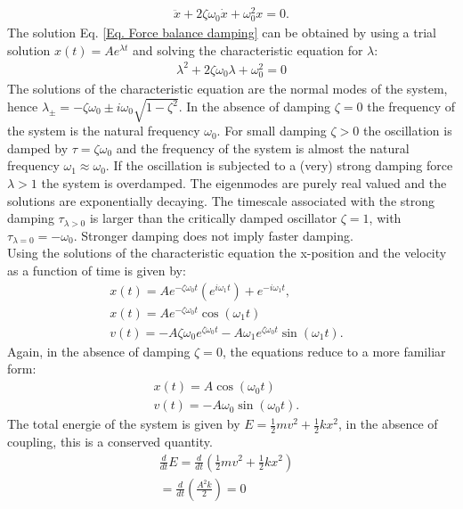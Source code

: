 \documentclass{article}
\begin{document}
\begin{align}
    \ddot{x} + 2\zeta\omega_0\dot{x} +\omega_0^2x = 0.
    \label{Eq. Force balance damping}
\end{align}
The solution Eq. \ref{Eq. Force balance damping} can be obtained by using a trial solution $x(t) = Ae^{\lambda t}$ and solving the characteristic equation for $\lambda$:
\begin{align}
    \lambda^2 + 2\zeta\omega_0\lambda + \omega_0^2 = 0
\end{align}
The solutions of the characteristic equation are the normal modes of the system, hence $\lambda_{\pm} = -\zeta\omega_0 \pm i\omega_0\sqrt{1-\zeta^2}$. In the absence of damping $\zeta = 0$ the frequency of the system is the natural frequency $\omega_0$. For small damping $\zeta>0$ the oscillation is damped by $\tau = \zeta \omega_0$ and the frequency of the system is almost the natural frequency $\omega_1 \approx \omega_0$. If the oscillation is subjected to a (very) strong damping force $\lambda > 1$ the system is overdamped. The eigenmodes are purely real valued and the solutions are exponentially decaying. The timescale associated with the strong damping $\tau_{\lambda>0}$ is larger than the critically damped oscillator $\zeta =1$, with $\tau_{\lambda=0} = -\omega_0$. Stronger damping does not imply faster damping.\\

Using the solutions of the characteristic equation the x-position and the velocity as a function of time is given by:
\begin{align}
    x(t) = Ae^{-\zeta\omega_0t}(e^{i\omega_1t})+e^{-i\omega_1t}, & \\
    x(t) = Ae^{-\zeta\omega_0t}\cos(\omega_1 t) & \\
    v(t) = -A \zeta \omega_0 e^{\zeta \omega_0 t} - A \omega_1e^{\zeta \omega_0 t}\sin(\omega_1 t).
\end{align}
Again, in the absence of damping $\zeta = 0$, the equations reduce to a more familiar form:
\begin{align}
    x(t) = A\cos(\omega_0 t) & \\
    v(t) = - A \omega_0\sin(\omega_0 t).
\end{align}
The total energie of the system is given by $E=\frac{1}{2}mv^2+\frac{1}{2}kx^2$, in the absence of coupling, this is a conserved quantity.
\begin{align}
    \frac{d}{dt}E = \frac{d}{dt}(\frac{1}{2}mv^2 +\frac{1}{2}kx^2) & \\
    = \frac{d}{dt}(\frac{A^2 k}{2}) = 0
\end{align}
\end{document}
